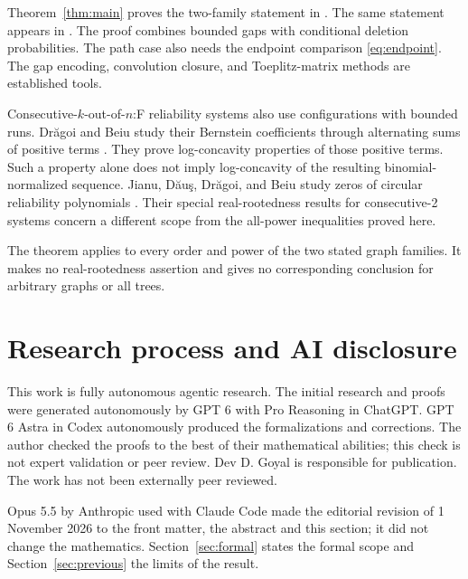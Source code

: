 \documentclass[11pt]{article}
\theoremstyle{definition}
\theoremstyle{remark}
\begin{document}
Theorem~\ref{thm:main} proves the two-family statement in \cite[Conjecture~1.8]{GZ}. The same statement appears in \cite[Conjecture~4.1.8, p.~57]{Zhang}. The proof combines bounded gaps with conditional deletion probabilities. The path case also needs the endpoint comparison \eqref{eq:endpoint}. The gap encoding, convolution closure, and Toeplitz-matrix methods are established tools.

Consecutive-$k$-out-of-$n$:F reliability systems also use configurations with bounded runs. Dr\u{a}goi and Beiu study their Bernstein coefficients through alternating sums of positive terms \cite{DB}. They prove log-concavity properties of those positive terms. Such a property alone does not imply log-concavity of the resulting binomial-normalized sequence. Jianu, D\u{a}u\c{s}, Dr\u{a}goi, and Beiu study zeros of circular reliability polynomials \cite{JDDB}. Their special real-rootedness results for consecutive-2 systems concern a different scope from the all-power inequalities proved here.

The theorem applies to every order and power of the two stated graph families. It makes no real-rootedness assertion and gives no corresponding conclusion for arbitrary graphs or all trees.

\section{Research process and AI disclosure}\label{sec:disclosure}
This work is fully autonomous agentic research. The initial research and
proofs were generated autonomously by GPT 6 with Pro Reasoning in ChatGPT.
GPT 6 Astra in Codex autonomously produced the formalizations and
corrections. The author checked the proofs to the best of their
mathematical abilities; this check is not expert validation or peer review.
Dev D. Goyal is responsible for publication. The work has not been
externally peer reviewed.

Opus 5.5 by Anthropic used with Claude Code made the editorial revision of
1 November 2026 to the front matter, the abstract and this section; it did
not change the mathematics. Section~\ref{sec:formal} states the formal
scope and Section~\ref{sec:previous} the limits of the result.
\end{document}
